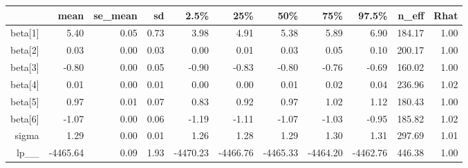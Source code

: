 \begin{table}[ht]
\centering
\begin{tabular}{rrrrrrrrrrr}
  \hline
 & mean & se\_mean & sd & 2.5\% & 25\% & 50\% & 75\% & 97.5\% & n\_eff & Rhat \\ 
  \hline
beta[1] & 5.40 & 0.05 & 0.73 & 3.98 & 4.91 & 5.38 & 5.89 & 6.90 & 184.17 & 1.00 \\ 
  beta[2] & 0.03 & 0.00 & 0.03 & 0.00 & 0.01 & 0.03 & 0.05 & 0.10 & 200.17 & 1.00 \\ 
  beta[3] & -0.80 & 0.00 & 0.05 & -0.90 & -0.83 & -0.80 & -0.76 & -0.69 & 160.02 & 1.00 \\ 
  beta[4] & 0.01 & 0.00 & 0.01 & 0.00 & 0.00 & 0.01 & 0.02 & 0.04 & 236.96 & 1.02 \\ 
  beta[5] & 0.97 & 0.01 & 0.07 & 0.83 & 0.92 & 0.97 & 1.02 & 1.12 & 180.43 & 1.00 \\ 
  beta[6] & -1.07 & 0.00 & 0.06 & -1.19 & -1.11 & -1.07 & -1.03 & -0.95 & 185.82 & 1.02 \\ 
  sigma & 1.29 & 0.00 & 0.01 & 1.26 & 1.28 & 1.29 & 1.30 & 1.31 & 297.69 & 1.01 \\ 
  lp\_\_ & -4465.64 & 0.09 & 1.93 & -4470.23 & -4466.76 & -4465.33 & -4464.20 & -4462.76 & 446.38 & 1.00 \\ 
   \hline
\end{tabular}
\end{table}
